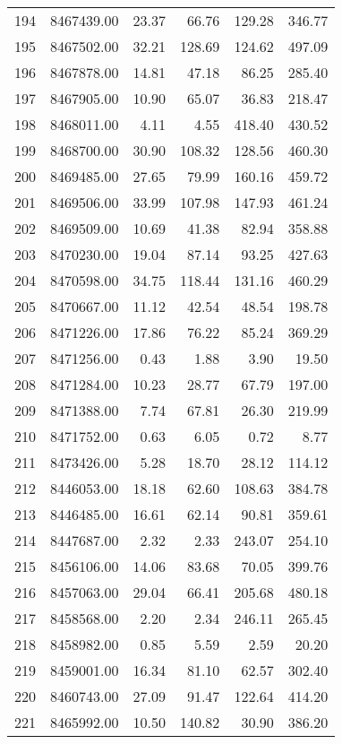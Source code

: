 \begin{table}[ht]
\begin{tabular}{rrrrrr}
  194 & 8467439.00 & 23.37 & 66.76 & 129.28 & 346.77 \\ 
  195 & 8467502.00 & 32.21 & 128.69 & 124.62 & 497.09 \\ 
  196 & 8467878.00 & 14.81 & 47.18 & 86.25 & 285.40 \\ 
  197 & 8467905.00 & 10.90 & 65.07 & 36.83 & 218.47 \\ 
  198 & 8468011.00 & 4.11 & 4.55 & 418.40 & 430.52 \\ 
  199 & 8468700.00 & 30.90 & 108.32 & 128.56 & 460.30 \\ 
  200 & 8469485.00 & 27.65 & 79.99 & 160.16 & 459.72 \\ 
  201 & 8469506.00 & 33.99 & 107.98 & 147.93 & 461.24 \\ 
  202 & 8469509.00 & 10.69 & 41.38 & 82.94 & 358.88 \\ 
  203 & 8470230.00 & 19.04 & 87.14 & 93.25 & 427.63 \\ 
  204 & 8470598.00 & 34.75 & 118.44 & 131.16 & 460.29 \\ 
  205 & 8470667.00 & 11.12 & 42.54 & 48.54 & 198.78 \\ 
  206 & 8471226.00 & 17.86 & 76.22 & 85.24 & 369.29 \\ 
  207 & 8471256.00 & 0.43 & 1.88 & 3.90 & 19.50 \\ 
  208 & 8471284.00 & 10.23 & 28.77 & 67.79 & 197.00 \\ 
  209 & 8471388.00 & 7.74 & 67.81 & 26.30 & 219.99 \\ 
  210 & 8471752.00 & 0.63 & 6.05 & 0.72 & 8.77 \\ 
  211 & 8473426.00 & 5.28 & 18.70 & 28.12 & 114.12 \\ 
  212 & 8446053.00 & 18.18 & 62.60 & 108.63 & 384.78 \\ 
  213 & 8446485.00 & 16.61 & 62.14 & 90.81 & 359.61 \\ 
  214 & 8447687.00 & 2.32 & 2.33 & 243.07 & 254.10 \\ 
  215 & 8456106.00 & 14.06 & 83.68 & 70.05 & 399.76 \\ 
  216 & 8457063.00 & 29.04 & 66.41 & 205.68 & 480.18 \\ 
  217 & 8458568.00 & 2.20 & 2.34 & 246.11 & 265.45 \\ 
  218 & 8458982.00 & 0.85 & 5.59 & 2.59 & 20.20 \\ 
  219 & 8459001.00 & 16.34 & 81.10 & 62.57 & 302.40 \\ 
  220 & 8460743.00 & 27.09 & 91.47 & 122.64 & 414.20 \\ 
  221 & 8465992.00 & 10.50 & 140.82 & 30.90 & 386.20 \\ 

\end{tabular}
\end{table}
